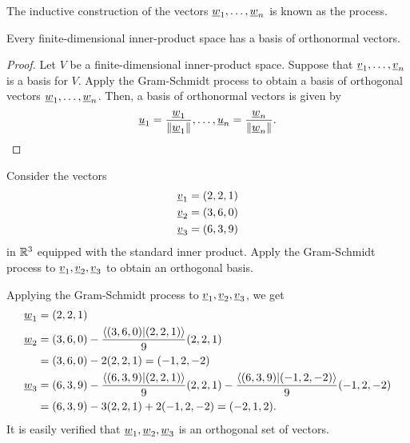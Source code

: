 The inductive construction of the vectors $\underline{w}_1, \ldots, \underline{w}_n$ is known as the  process.

\begin{corollary}
\label{cor:orthonormal_basis}
Every finite-dimensional inner-product space has a basis of orthonormal vectors.
\end{corollary}
\begin{proof}
Let $V$ be a finite-dimensional inner-product space.
Suppose that $\underline{v}_1, \ldots, \underline{v}_n$ is a basis for $V$.
Apply the Gram-Schmidt process to obtain a basis of orthogonal vectors $\underline{w}_1, \ldots, \underline{w}_n$.
Then, a basis of orthonormal vectors is given by
\begin{equation*}
\underline{u}_1 = \frac{ \underline{w}_1 }{ \left\| \underline{w}_1 \right\| }, \ldots,
\underline{u}_n = \frac{ \underline{w}_n }{ \left\| \underline{w}_n \right\| }.
\end{equation*}
\end{proof}

\begin{example}
Consider the vectors
\begin{align*}
\underline{v}_1 &= (2,2,1) \\
\underline{v}_2 &= (3,6,0) \\
\underline{v}_3 &= (6,3,9)
\end{align*}
in $\mathbb{R}^3$ equipped with the standard inner product.
Apply the Gram-Schmidt process to $\underline{v}_1, \underline{v}_2, \underline{v}_3$ to obtain an orthogonal basis.

Applying the Gram-Schmidt process to $\underline{v}_1, \underline{v}_2, \underline{v}_3$, we get
\begin{align*}
\underline{w}_1 &= (2,2,1) \\
\underline{w}_2 &= (3,6,0)
- \frac{ \left\langle (3,6,0) | (2,2,1) \right\rangle }{ 9 } (2,2,1) \\
&= (3,6,0) - 2 (2,2,1) = (-1,2,-2) \\
\underline{w}_3 &= (6,3,9)
- \frac{ \left\langle (6,3,9) | (2,2,1) \right\rangle }{ 9 } (2,2,1)
- \frac{ \left\langle (6,3,9) | (-1,2,-2) \right\rangle }{ 9 } (-1,2,-2) \\
&= (6,3,9) - 3 (2,2,1) + 2 (-1,2,-2) = (-2,1,2) .
\end{align*}
It is easily verified that $\underline{w}_1, \underline{w}_2, \underline{w}_3$ is an orthogonal set of vectors.
\end{example}

